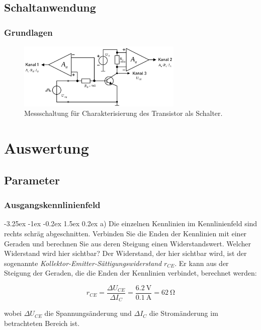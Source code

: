 \documentclass[
	a4paper, %
	12pt, %
]{CSUniSchoolLabReport}
\makeatletter
\renewcommand\paragraph{\@startsection{paragraph}{4}{\z@}%
  {-3.25ex \@plus -1ex \@minus -0.2ex}%
  {1.5ex \@plus 0.2ex}%
  {\normalfont\normalsize\bfseries}}
\makeatother
\begin{document}
\subsection{Schaltanwendung}
\subsubsection{Grundlagen}
\begin{figure}[H]
	\centering
	\includegraphics[width=0.7\textwidth]{Figures/MessschaltungSchaltanwendung.png}
	\caption{Messschaltung für Charakterisierung des Transistor als Schalter.}
	\label{fig:MessschaltungSchaltanwendung}
\end{figure}

\section{Auswertung}
\subsection{Parameter}
\subsubsection{Ausgangskennlinienfeld}
\paragraph{a) Die einzelnen Kennlinien im Kennlinienfeld sind rechts schräg abgeschnitten. Verbinden Sie die Enden der Kennlinien mit einer Geraden und berechnen Sie aus deren Steigung einen Widerstandswert. Welcher Widerstand wird hier sichtbar?}
Der Widerstand, der hier sichtbar wird, ist der sogenannte \emph{Kollektor-Emitter-Sättigungswiderstand} $r_{CE}$. Er kann aus der Steigung der Geraden, die die Enden der Kennlinien verbindet, berechnet werden:

\[
r_{CE} = \frac{\Delta U_{CE}}{\Delta I_C} = \frac{\SI{6.2}{\volt}}{\SI{0.1}{\ampere}} = \SI{62}{\ohm}
\]

wobei $\Delta U_{CE}$ die Spannungsänderung und $\Delta I_C$ die Stromänderung im betrachteten Bereich ist.
\end{document}
